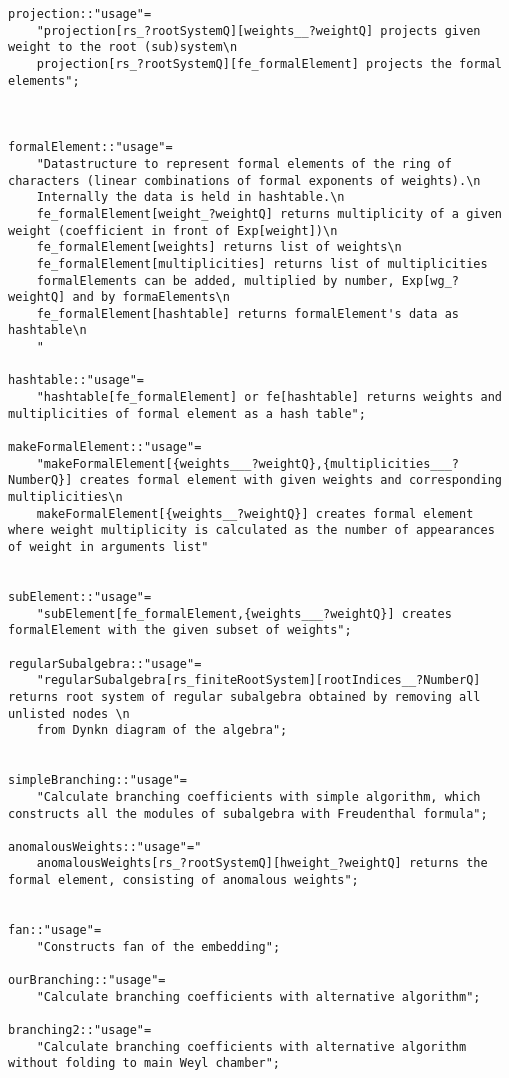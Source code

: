 \documentclass[preprint,12pt]{article}
\begin{document}
\begin{lstlisting}
projection::"usage"=
    "projection[rs_?rootSystemQ][weights__?weightQ] projects given weight to the root (sub)system\n
    projection[rs_?rootSystemQ][fe_formalElement] projects the formal elements";



formalElement::"usage"=
    "Datastructure to represent formal elements of the ring of characters (linear combinations of formal exponents of weights).\n
    Internally the data is held in hashtable.\n
    fe_formalElement[weight_?weightQ] returns multiplicity of a given weight (coefficient in front of Exp[weight])\n
    fe_formalElement[weights] returns list of weights\n
    fe_formalElement[multiplicities] returns list of multiplicities
    formalElements can be added, multiplied by number, Exp[wg_?weightQ] and by formaElements\n
    fe_formalElement[hashtable] returns formalElement's data as hashtable\n
    "

hashtable::"usage"=
    "hashtable[fe_formalElement] or fe[hashtable] returns weights and multiplicities of formal element as a hash table";

makeFormalElement::"usage"=
    "makeFormalElement[{weights___?weightQ},{multiplicities___?NumberQ}] creates formal element with given weights and corresponding multiplicities\n
    makeFormalElement[{weights__?weightQ}] creates formal element where weight multiplicity is calculated as the number of appearances of weight in arguments list"


subElement::"usage"=
    "subElement[fe_formalElement,{weights___?weightQ}] creates formalElement with the given subset of weights";

regularSubalgebra::"usage"=
    "regularSubalgebra[rs_finiteRootSystem][rootIndices__?NumberQ] returns root system of regular subalgebra obtained by removing all unlisted nodes \n
    from Dynkn diagram of the algebra";


simpleBranching::"usage"=
    "Calculate branching coefficients with simple algorithm, which constructs all the modules of subalgebra with Freudenthal formula";

anomalousWeights::"usage"="
    anomalousWeights[rs_?rootSystemQ][hweight_?weightQ] returns the formal element, consisting of anomalous weights";


fan::"usage"=
    "Constructs fan of the embedding";

ourBranching::"usage"=
    "Calculate branching coefficients with alternative algorithm";

branching2::"usage"=
    "Calculate branching coefficients with alternative algorithm without folding to main Weyl chamber";


\end{lstlisting}
\end{document}
